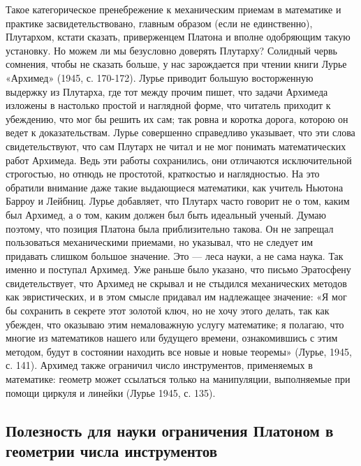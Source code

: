 Такое категорическое пренебрежение к механическим приемам в математике
и практике засвидетельствовано, главным образом (если не единственно),
Плутархом, кстати сказать, приверженцем Платона и вполне одобряющим
такую установку. Но можем ли мы безусловно доверять Плутарху? Солидный
червь сомнения, чтобы не сказать больше, у нас зарождается при чтении
книги Лурье «Архимед» (1945, с. 170-172). Лурье приводит большую
восторженную выдержку из Плутарха, где тот между прочим пишет, что
задачи Архимеда изложены в настолько простой и наглядной форме, что
читатель приходит к убеждению, что мог бы решить их сам; так ровна и
коротка дорога, которою он ведет к доказательствам. Лурье совершенно
справедливо указывает, что эти слова свидетельствуют, что сам Плутарх
не читал и не мог понимать математических работ Архимеда. Ведь эти
работы сохранились, они отличаются исключительной строгостью, но
отнюдь не простотой, краткостью и наглядностью. На это обратили
внимание даже такие выдающиеся математики, как учитель Ньютона Барроу
и Лейбниц. Лурье добавляет, что Плутарх часто говорит не о том, каким
был Архимед, а о том, каким должен был быть идеальный ученый. Думаю
поэтому, что позиция Платона была приблизительно такова. Он не
запрещал пользоваться механическими приемами, но указывал, что не
следует им придавать слишком большое значение. Это --- леса науки, а
не сама наука. Так именно и поступал Архимед. Уже раньше было
указано, что письмо Эратосфену свидетельствует, что Архимед не скрывал
и не стыдился механических методов как эвристических, и в этом смысле
придавал им надлежащее значение: «Я мог бы сохранить в секрете этот
золотой ключ, но не хочу этого делать, так как убежден, что оказываю
этим немаловажную услугу математике; я полагаю, что многие из
математиков нашего или будущего времени, ознакомившись с этим методом,
будут в состоянии находить все новые и новые теоремы» (Лурье, 1945, с.
141). Архимед также ограничил число инструментов, применяемых в
математике: геометр может ссылаться только на манипуляции, выполняемые
при помощи циркуля и линейки (Лурье 1945, с. 135).

\subsection{Полезность для науки ограничения Платоном в геометрии
числа инструментов}

